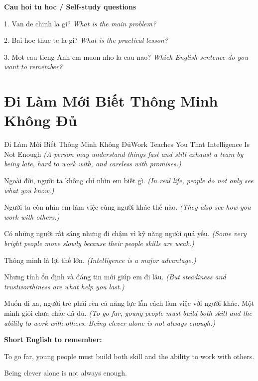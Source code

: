 \begin{tuhocnhanh}
\textbf{Cau hoi tu hoc / Self-study questions}

1. Van de chinh la gi? \textit{What is the main problem?}

2. Bai hoc thuc te la gi? \textit{What is the practical lesson?}

3. Mot cau tieng Anh em muon nho la cau nao? \textit{Which English sentence do you want to remember?}
\end{tuhocnhanh}
\ngancach

\section{Đi Làm Mới Biết Thông Minh Không Đủ}
\begin{truyen}{Đi Làm Mới Biết Thông Minh Không Đủ}{Work Teaches You That Intelligence Is Not Enough}
\textit{(A person may understand things fast and still exhaust a team by being late, hard to work with, and careless with promises.)}

Ngoài đời, người ta không chỉ nhìn em biết gì.
\textit{(In real life, people do not only see what you know.)}

Người ta còn nhìn em làm việc cùng người khác thế nào.
\textit{(They also see how you work with others.)}

Có những người rất sáng nhưng đi chậm vì kỹ năng người quá yếu.
\textit{(Some very bright people move slowly because their people skills are weak.)}

Thông minh là lợi thế lớn.
\textit{(Intelligence is a major advantage.)}

Nhưng tính ổn định và đáng tin mới giúp em đi lâu.
\textit{(But steadiness and trustworthiness are what help you last.)}

\end{truyen}

\begin{baihoc}
Muốn đi xa, người trẻ phải rèn cả năng lực lẫn cách làm việc với người khác. Một mình giỏi chưa chắc đã đủ.
\textit{(To go far, young people must build both skill and the ability to work with others. Being clever alone is not always enough.)}
\end{baihoc}

\begin{ghinhoanh}
\textbf{Short English to remember:}

To go far, young people must build both skill and the ability to work with others.

Being clever alone is not always enough.

\end{ghinhoanh}

